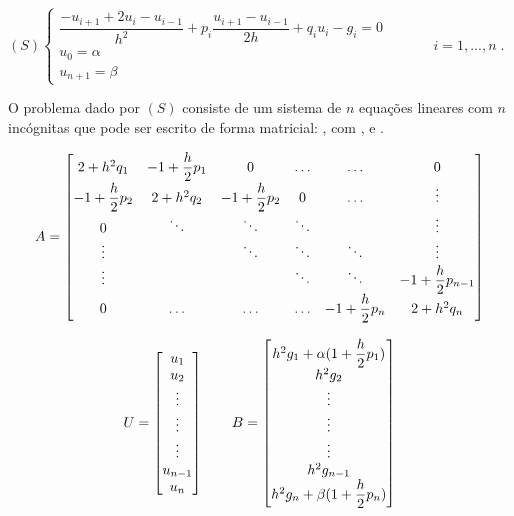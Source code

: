 \begin{center}
	\begin{math}
		(S)
		\left\{
    		\begin{array}{l}
      			\dfrac{-u_{i+1}+ 2u_i - u_{i-1}}{h^2} + p_i\dfrac{u_{i+1} - u_{i-1}}{2h}  + q_i u_i - g_i = 0 \\
				u_0 = \alpha\\
				u_{n+1} = \beta      			
    		\end{array}
    		\begin{array}{l}
      		\qquad \\
			\qquad \\
			\qquad	   
    		\end{array}
    		\begin{array}{l}
      			i = 1, ... , n \;.
    		\end{array}
		\right.
	\end{math}
\end{center} 

O problema dado por $(S)$ consiste de um sistema de $n$ equações lineares com $n$ incógnitas que pode ser escrito de forma matricial: , com ,  e .


\begin{equation*}
	\cmrtext{A} =
	\begin{bmatrix}
		2+h^2q_1 & -1+\dfrac{h}{2}p_1 & 0  & \ldots & \ldots & 0 \\
		-1+\dfrac{h}{2}p_2 & 2+h^2q_2 & -1+\dfrac{h}{2}p_2 & 0 & \ldots & \vdots\\
		0 &\ddots&\ddots&\ddots&& \vdots \\
		\vdots &&\ddots&\ddots&\ddots& \vdots \\
		\vdots & & & \ddots & \ddots & -1+\dfrac{h}{2}p_{n-1} \\
		0 & \ldots & \ldots & \ldots & -1+\dfrac{h}{2}p_n & 2+h^2q_n	
	\end{bmatrix}
\end{equation*}

\begin{equation*}
	\cmrtext{U} =
	\begin{bmatrix}
		u_1 \\
		u_2 \\
		\vdots \\
		\vdots \\
		\vdots \\
		u_{n-1} \\
		u_n
	\end{bmatrix}
	\qquad
	\cmrtext{B} =
	\begin{bmatrix}
		h^2g_1 + \alpha(1+\dfrac{h}{2}p_1) \\
		h^2g_2 \\
		\vdots \\
		\vdots \\
		\vdots \\
		h^2g_{n-1} \\
		h^2g_{n} + \beta(1+\dfrac{h}{2}p_n)
	\end{bmatrix}
\end{equation*}

